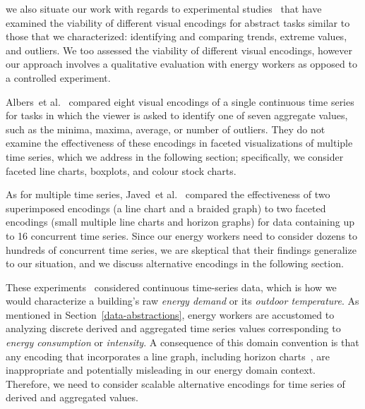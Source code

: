 \documentclass[journal]{vgtc}                %
\newcommand{\bstart}[1]{\vspace{1mm} \noindent{\textbf{#1:}}}
\newcommand{\etal}{et al.}
\begin{document}
\bstart{Evaluating visualizations of time-oriented data} we also situate our work with regards to experimental studies~\cite{Albers2014,Fuchs2013,Javed2010} that have examined the viability of different visual encodings for abstract tasks similar to those that we characterized: identifying and comparing trends, extreme values, and outliers.
We too assessed the viability of different visual encodings, however our approach involves a qualitative evaluation with energy workers as opposed to a controlled experiment.

Albers~\etal~\cite{Albers2014} compared eight visual encodings of a single continuous time series for tasks in which the viewer is asked to identify one of seven aggregate values, such as the minima, maxima, average, or number of outliers. 
They do not examine the effectiveness of these encodings in faceted visualizations of multiple time series, which we address in the following section; specifically, we consider faceted line charts, boxplots, and colour stock charts.

As for multiple time series, Javed~\etal~\cite{Javed2010} compared the effectiveness of two superimposed encodings (a line chart and a braided graph) to two faceted encodings (small multiple line charts and horizon graphs) for data containing up to 16 concurrent time series.
Since our energy workers need to consider dozens to hundreds of concurrent time series, we are skeptical that their findings generalize to our situation, and we discuss alternative encodings in the following section. 

These experiments~\cite{Albers2014,Fuchs2013,Javed2010} considered continuous time-series data, which is how we would characterize a building's raw {\it energy demand} or its {\it outdoor temperature}. 
As mentioned in Section~\ref{data-abstractions}, energy workers are accustomed to analyzing discrete derived and aggregated time series values corresponding to {\it energy consumption} or {\it intensity}.
A consequence of this domain convention is that any encoding that incorporates a line graph, including horizon charts~\cite{Heer2009}, are inappropriate and potentially misleading in our energy domain context.
Therefore, we need to consider scalable alternative encodings for time series of derived and aggregated values.

\end{document}
